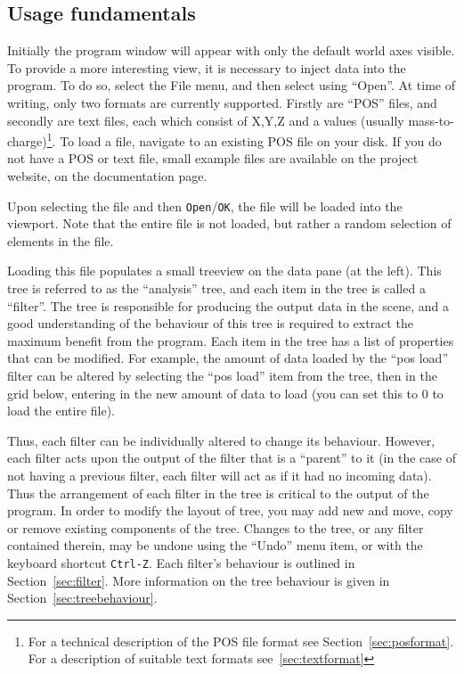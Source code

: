 \documentclass[10pt]{article}
\begin{document}
\subsection{Usage fundamentals}
Initially the program window will appear with only the default world axes visible. To provide a more interesting view, it is necessary to inject data into the program.  To do so, select the File menu, and then select using ``Open''. At time of writing, only two formats are currently supported. Firstly are ``POS'' files, and secondly are text files, each which consist of X,Y,Z and a values (usually mass-to-charge)\footnote{For a technical description of the POS file format see Section~\ref{sec:posformat}. For a description of suitable text formats see~\ref{sec:textformat}}. To load a file, navigate to an existing POS file on your disk. If you do not have a POS or text file, small example files are available on the project website, on the documentation page.  

Upon selecting the file and then \texttt{Open}/\texttt{OK}, the file will be loaded into the viewport. Note that the entire file is not loaded, but rather a random selection of elements in the file. 

Loading this file populates a small treeview on the data pane (at the left). This tree is referred to as the ``analysis'' tree, and each item in the tree is called a ``filter''. The tree is responsible for producing the output data in the scene, and a good understanding of the behaviour of this tree is required to extract the maximum benefit from the program. Each item in the tree has a list of properties that can be modified. For example, the amount of data loaded by the ``pos load'' filter can be altered by selecting the ``pos load'' item from the tree, then in the grid below, entering in the new amount of data to load (you can set this to 0 to load the entire file). 

Thus, each filter can be individually altered to change its behaviour. However, each filter acts upon the output of the filter that is a ``parent'' to it (in the case of not having a previous filter, each filter will act as if it had no incoming data). Thus the arrangement of each filter in the tree is critical to the output of the program. In order to modify the  layout of tree, you may add new and move, copy or remove existing components of the tree.  Changes to the tree, or any filter contained therein, may be undone using the ``Undo'' menu item, or with the keyboard shortcut \texttt{Ctrl-Z}.  Each filter's behaviour is outlined in Section~\ref{sec:filter}. More information on the tree behaviour is given in Section~\ref{sec:treebehaviour}.
\end{document}
